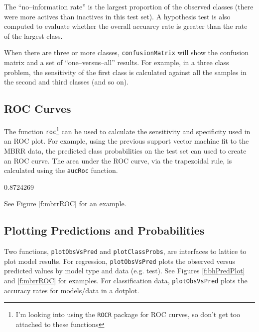 \documentclass[12pt]{article}
\begin{document}
The ``no--information rate'' is the largest proportion of the observed classes (there were more actives than inactives in this test set). A hypothesis test is also computed to evaluate whether the overall accuarcy rate is greater than the rate of the largest class. 

When there are three or more classes, \texttt{confusionMatrix} will show the confusion matrix and a set of ``one--versus--all'' results. For example, in a three class problem, the sensitivity of the first class is calculated against all the samples in the second and third classes (and so on).


\subsection*{ROC Curves}

The function \texttt{roc}\footnote{I'm looking into using the \texttt{ROCR} package for ROC curves, so don't get too attached to these functions} can be used to calculate the sensitivity and specificity used in an ROC plot. For example, using the previous support vector machine fit to the MBRR data, the predicted class probabilities on the test set can used to create an ROC curve. The area under the ROC curve, via the trapezoidal rule, is calculated using the \texttt{aucRoc} function. 

\begin{small}
\begin{Schunk}
\begin{Soutput}
[1] 0.8724269
\end{Soutput}
\end{Schunk}
\end{small}

See Figure \ref{f:mbrrROC} for an example.

\subsection*{Plotting Predictions and Probabilities}

Two functions, \texttt{plotObsVsPred} and \texttt{plotClassProbs}, are interfaces to lattice to plot model results. For regression, \texttt{plotObsVsPred} plots the observed versus predicted values by model type and data (e.g. test). See Figures \ref{f:bhPredPlot} and \ref{f:mbrrROC}  for examples. For classification data, \texttt{plotObsVsPred} plots the accuracy rates for models/data in a dotplot. 
\end{document}
